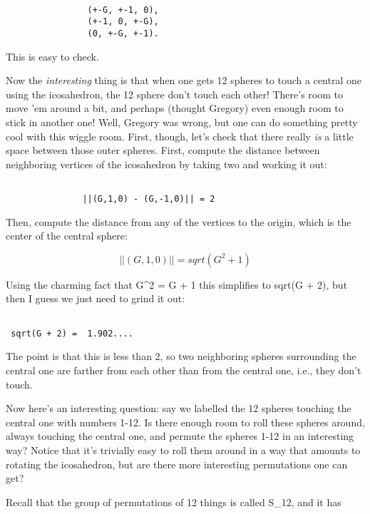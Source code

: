 \begin{verbatim}

                (+-G, +-1, 0),
                (+-1, 0, +-G),
                (0, +-G, +-1).
\end{verbatim}
    

This is easy to check.  

Now the \emph{interesting} thing is that when one gets 12 spheres to touch a
central one using the icosahedron, the 12 sphere don't touch each other!
There's room to move 'em around a bit, and perhaps (thought Gregory)
even enough room to stick in another one!  Well, Gregory was wrong, but
one can do something pretty cool with this wiggle room.  First, though,
let's check that there really \emph{is} a little space between those outer
spheres.  First, compute the distance between neighboring vertices of
the icosahedron by taking two and working it out:


\begin{verbatim}

               ||(G,1,0) - (G,-1,0)|| = 2
\end{verbatim}
    

Then, compute the distance from any of the vertices to the origin, which
is the center of the central sphere:


$$

               ||(G,1,0)|| = sqrt(G^{2} + 1)
$$
    

Using the charming fact that G^{2} = G + 1 this simplifies to
sqrt(G + 2), but then I guess we just need to grind it out:


\begin{verbatim}

 sqrt(G + 2) =  1.902....
\end{verbatim}
    

The point is that this is less than 2, so two neighboring spheres
surrounding the central one are farther from each other than from the
central one, i.e., they don't touch.

Now here's an interesting question: say we labelled the 12 spheres
touching the central one with numbers 1-12.  Is there enough room to
roll these spheres around, always touching the central one, and permute
the spheres 1-12 in an interesting way?  Notice that it's trivially easy
to roll them around in a way that amounts to rotating the icosahedron,
but are there more interesting permutations one can get?

Recall that the group of permutations of 12 things is called S_{12}, and
it has 


